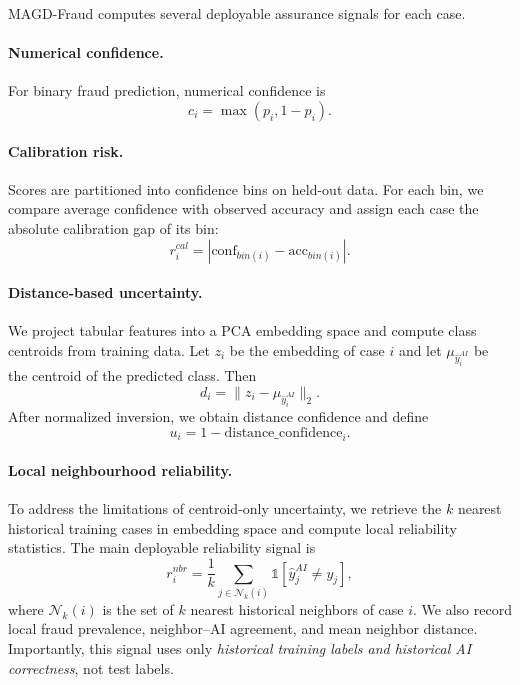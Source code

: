 MAGD-Fraud computes several deployable assurance signals for each case.

\paragraph{Numerical confidence.}
For binary fraud prediction, numerical confidence is
\begin{equation}
c_i = \max(p_i, 1 - p_i).
\end{equation}

\paragraph{Calibration risk.}
Scores are partitioned into confidence bins on held-out data. For each bin, we compare average confidence with observed accuracy and assign each case the absolute calibration gap of its bin:
\begin{equation}
r^{cal}_i = \left|\text{conf}_{bin(i)} - \text{acc}_{bin(i)}\right|.
\end{equation}

\paragraph{Distance-based uncertainty.}
We project tabular features into a PCA embedding space and compute class centroids from training data. Let $z_i$ be the embedding of case $i$ and let $\mu_{\hat{y}^{AI}_i}$ be the centroid of the predicted class. Then
\begin{equation}
d_i = \|z_i - \mu_{\hat{y}^{AI}_i}\|_2.
\end{equation}
After normalized inversion, we obtain distance confidence and define
\begin{equation}
u_i = 1 - \text{distance\_confidence}_i.
\end{equation}

\paragraph{Local neighbourhood reliability.}
To address the limitations of centroid-only uncertainty, we retrieve the $k$ nearest historical training cases in embedding space and compute local reliability statistics. The main deployable reliability signal is
\begin{equation}
r^{nbr}_i = \frac{1}{k}\sum_{j \in \mathcal{N}_k(i)} \mathbb{1}[\hat{y}^{AI}_j \neq y_j],
\end{equation}
where $\mathcal{N}_k(i)$ is the set of $k$ nearest historical neighbors of case $i$. We also record local fraud prevalence, neighbor--AI agreement, and mean neighbor distance. Importantly, this signal uses only \emph{historical training labels and historical AI correctness}, not test labels.


